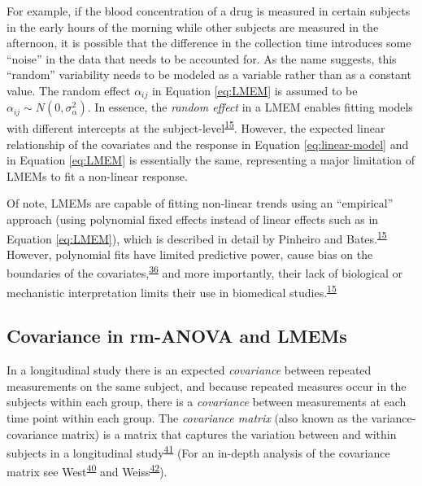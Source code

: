 \documentclass[
]{article}
\begin{document}
For example, if the blood concentration of a drug is measured in certain subjects in the early hours of the morning while other subjects are measured in the afternoon, it is possible that the difference in the collection time introduces some ``noise'' in the data that needs to be accounted for. As the name suggests, this ``random'' variability needs to be modeled as a variable rather than as a constant value. The random effect \(\alpha_{ij}\) in Equation \eqref{eq:LMEM} is assumed to be \(\alpha_{ij} \sim N(0,\sigma^2_\alpha)\). In essence, the \emph{random effect} in a LMEM enables fitting models with different intercepts at the subject-level\textsuperscript{\protect\hyperlink{ref-pinheiro2006}{15}}. However, the expected linear relationship of the covariates and the response in Equation \eqref{eq:linear-model} and in Equation \eqref{eq:LMEM} is essentially the same, representing a major limitation of LMEMs to fit a non-linear response.

Of note, LMEMs are capable of fitting non-linear trends using an ``empirical'' approach (using polynomial fixed effects instead of linear effects such as in Equation \eqref{eq:LMEM}), which is described in detail by Pinheiro and Bates.\textsuperscript{\protect\hyperlink{ref-pinheiro2006}{15}} However, polynomial fits have limited predictive power, cause bias on the boundaries of the covariates,\textsuperscript{\protect\hyperlink{ref-beck1998}{36}} and more importantly, their lack of biological or mechanistic interpretation limits their use in biomedical studies.\textsuperscript{\protect\hyperlink{ref-pinheiro2006}{15}}

\hypertarget{covariance-in-rm-anova-and-lmems}{%
\subsection{Covariance in rm-ANOVA and LMEMs}\label{covariance-in-rm-anova-and-lmems}}

In a longitudinal study there is an expected \emph{covariance} between repeated measurements on the same subject, and because repeated measures occur in the subjects within each group, there is a \emph{covariance} between measurements at each time point within each group. The \emph{covariance matrix} (also known as the variance-covariance matrix) is a matrix that captures the variation between and within subjects in a longitudinal study\textsuperscript{\protect\hyperlink{ref-wolfinger1996}{41}} (For an in-depth analysis of the covariance matrix see West\textsuperscript{\protect\hyperlink{ref-west2014}{40}} and Weiss\textsuperscript{\protect\hyperlink{ref-weiss2005}{42}}).
\end{document}

